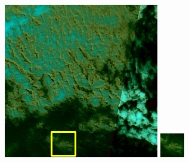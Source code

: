 \documentclass[UTF8]{ctexart}
\begin{document}
\begin{figure}[H]
{\begin{minipage}[b]{0.15\linewidth}
            \includegraphics[width=1\linewidth]{../log/spoon2/cut2/LC81620432014072LGN00_16237_spectral.jpg}\vspace{4pt}
            \includegraphics[width=1\linewidth]{../log/spoon2/cut2/tmp_cut_LC81620432014072LGN00_16237_spectral.jpg}\vspace{4pt}

\end{minipage}}
\end{figure}
\end{document}
